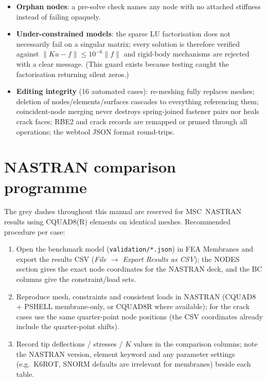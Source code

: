 \documentclass[11pt,a4paper]{report}
\begin{document}
\begin{itemize}
  \item \textbf{Orphan nodes}: a pre-solve check names any node with no
        attached stiffness instead of failing opaquely.
  \item \textbf{Under-constrained models}: the sparse LU factorisation does
        not necessarily fail on a singular matrix; every solution is therefore
        verified against $\lVert Ku-f\rVert \le 10^{-6}\lVert f\rVert$ and
        rigid-body mechanisms are rejected with a clear message. (This guard
        exists because testing caught the factorisation returning silent
        zeros.)
  \item \textbf{Editing integrity} (16 automated cases): re-meshing fully
        replaces meshes; deletion of nodes/elements/surfaces cascades to
        everything referencing them; coincident-node merging never destroys
        spring-joined fastener pairs nor heals crack faces; RBE2 and crack
        records are remapped or pruned through all operations; the webtool
        JSON format round-trips.
\end{itemize}

\chapter{NASTRAN comparison programme}

The grey dashes throughout this manual are reserved for MSC~NASTRAN results
using CQUAD8(R) elements on identical meshes. Recommended procedure per case:

\begin{enumerate}
  \item Open the benchmark model (\texttt{validation/*.json}) in FEA Membranes
        and export the results CSV (\emph{File $\to$ Export Results as CSV});
        the NODES section gives the exact node coordinates for the NASTRAN
        deck, and the BC columns give the constraint/load sets.
  \item Reproduce mesh, constraints and consistent loads in NASTRAN
        (CQUAD8 + PSHELL membrane-only, or CQUAD8R where available); for the
        crack cases use the same quarter-point node positions (the CSV
        coordinates already include the quarter-point shifts).
  \item Record tip deflections / stresses / $K$ values in the comparison
        columns; note the NASTRAN version, element keyword and any parameter
        settings (e.g.\ K6ROT, SNORM defaults are irrelevant for membranes)
        beside each table.
\end{enumerate}
\end{document}
